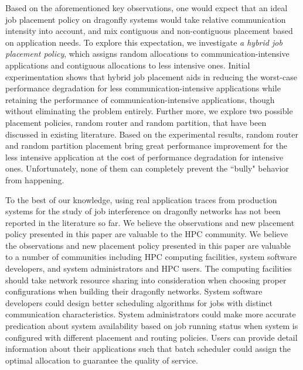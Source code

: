 Based on the aforementioned key observations, one would expect that an ideal job placement policy on dragonfly systems would take relative communication intensity into account, and mix contiguous and non-contiguous placement based on application needs. To explore this expectation, we investigate \emph{a hybrid job placement policy}, which assigns random allocations to communication-intensive applications and contiguous allocations to less intensive ones. Initial experimentation shows that hybrid job placement aids in reducing the worst-case performance degradation for less communication-intensive applications while retaining the performance of communication-intensive applications, though without eliminating the problem entirely. Further more, we explore two possible placement policies, random router and random partition, that have been discussed in existing literature. Based on the experimental results, random router and random partition placement bring great performance improvement for the less intensive application at the cost of performance degradation for intensive ones. Unfortunately, none of them can completely prevent the ``bully" behavior from happening. 

To the best of our knowledge, using real application traces from production systems for the study of job interference on dragonfly networks has not been reported in the literature so far. We believe the observations and new placement policy presented in this paper are valuable to the HPC community.
We believe the observations and new placement policy presented in this paper are valuable to a number of communities including HPC computing facilities, system software developers, and system administrators and HPC users. 
The computing facilities should take network resource sharing into consideration when choosing proper configurations when building their dragonfly networks. System software developers could design better scheduling algorithms for jobs with distinct communication characteristics. System administrators could make more accurate predication about system availability based on job running status when system is configured with different placement and routing policies. Users can provide detail information about their applications such that batch scheduler could assign the optimal allocation to guarantee the quality of service. 


